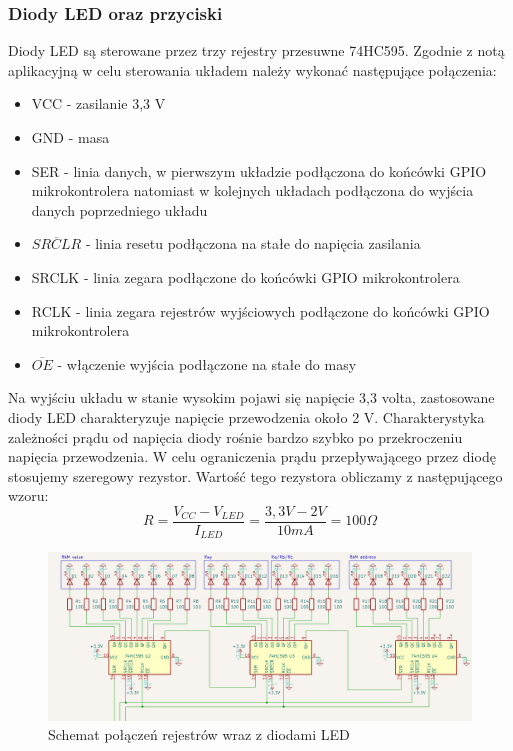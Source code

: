 \documentclass[../main.tex]{subfiles}
\begin{document}
\subsubsection{Diody LED oraz przyciski}
Diody LED są sterowane przez trzy rejestry przesuwne 74HC595. Zgodnie z notą aplikacyjną \cite{ti:74hc595}
w celu sterowania układem należy wykonać następujące połączenia:

\begin{itemize}
    \item VCC - zasilanie 3,3 V
    \item GND - masa
    \item SER - linia danych, w pierwszym układzie podłączona do końcówki GPIO mikrokontrolera natomiast w kolejnych 
    układach podłączona do wyjścia danych  poprzedniego układu
    \item $\overline{SRCLR}$ - linia resetu podłączona na stałe do napięcia zasilania
    \item SRCLK - linia zegara podłączone do końcówki GPIO mikrokontrolera
    \item RCLK - linia zegara rejestrów wyjściowych podłączone do końcówki GPIO mikrokontrolera
    \item $\overline{OE}$ - włączenie wyjścia podłączone na stałe do masy
\end{itemize}

Na wyjściu układu w stanie wysokim pojawi się napięcie 3,3 volta, zastosowane diody LED charakteryzuje napięcie przewodzenia około 2 V. Charakterystyka
zależności prądu od napięcia diody rośnie bardzo szybko po przekroczeniu napięcia przewodzenia. W celu ograniczenia prądu przepływającego przez diodę
stosujemy szeregowy rezystor. Wartość tego rezystora obliczamy z następującego wzoru: 
\begin{equation}
    R = \frac{V_{CC} - V_{LED}}{I_{LED}} = \frac{3,3 V - 2 V}{10 mA} = 100 \Omega
\end{equation}

\begin{figure}[H]
    \centering
    \includegraphics[width=\linewidth]{led_schemat.png}
    \caption{Schemat połączeń rejestrów wraz z diodami LED}
    \label{fig:led_connection}
\end{figure}
\end{document}
